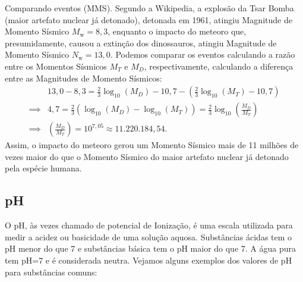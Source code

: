 \begin{example}{Comparando eventos (MMS).}
Segundo a Wikipedia, a explosão da Tsar Bomba (maior artefato nuclear já detonado), detonada em 1961, atingiu Magnitude de Momento Sísmico $M_{\mathrm w} = 8{,}3$, enquanto o impacto do meteoro que, presumidamente, causou a extinção dos dinossauros, atingiu Magnitude de Momento Sísmico $N_{\mathrm w} = 13{,}0$. Podemos comparar os eventos calculando a razão entre os Momentos Sísmicos $M_T$ e $M_D$, respectivamente, calculando a diferença entre as Magnitudes de Momento Sísmicos:
\begin{align*}
&13{,}0-8{,}3 = {\frac{2}{3}}\log_{10}\left(M_{D}\right)-10,7-\left( {\frac{2}{3}}\log_{10}\left(M_{T}\right)-10,7\right)\\
\implies & 4{,}7 = {\frac{2}{3}}\left(\log_{10}\left(M_{D}\right)-\log_{10}\left(M_{T}\right)\right) =  {\frac{2}{3}}\log_{10}\left(\frac{M_D}{M_T}\right)\\
\implies & \left(\frac{M_D}{M_T}\right) = 10^{7{,}05} \approx 11.220.184{,}54.
\end{align*} 
Assim, o impacto do meteoro gerou um Momento Sísmico mais de 11 milhões de vezes maior do que o Momento Sísmico do maior artefato nuclear já detonado pela espécie humana. 
\end{example}

\subsection{pH}

O pH, às vezes chamado de potencial de Ionização, é uma escala utilizada para medir a acidez ou basicidade de uma solução aquosa. Substâncias ácidas tem o pH menor do que 7 e substâncias básica tem o pH maior do que 7. A água pura tem pH=7 e é considerada neutra. Vejamos alguns exemplos dos valores de pH  para substâncias comuns:


